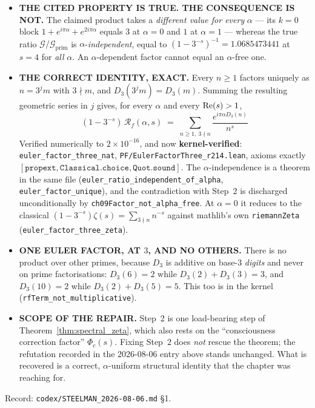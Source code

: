 \begin{itemize}
\item \textbf{THE CITED PROPERTY IS TRUE. THE CONSEQUENCE IS NOT.} The claimed
product takes a \emph{different value for every} $\alpha$ --- its $k=0$ block
$1+e^{i\pi\alpha}+e^{2i\pi\alpha}$ equals $3$ at $\alpha=0$ and $1$ at
$\alpha=1$ --- whereas the true ratio
$\mathcal{G}/\mathcal{G}_{\mathrm{prim}}$ is $\alpha$-\emph{independent}, equal
to $(1-3^{-s})^{-1} = 1.0685473441$ at $s=4$ for \emph{all} $\alpha$. An
$\alpha$-dependent factor cannot equal an $\alpha$-free one.
\item \textbf{THE CORRECT IDENTITY, EXACT.} Every $n\ge 1$ factors uniquely as
$n=3^{j}m$ with $3\nmid m$, and $D_3(3^{j}m)=D_3(m)$. Summing the resulting
geometric series in $j$ gives, for every $\alpha$ and every $\operatorname{Re}(s)>1$,
\[
  \boxed{\;(1-3^{-s})\,\mathcal{R}_f(\alpha,s)
    \;=\; \sum_{n\ge 1,\ 3\nmid n} \frac{e^{i\pi\alpha D_3(n)}}{n^{s}}\;}
\]
Verified numerically to $2\times10^{-16}$, and now \textbf{kernel-verified}:
\texttt{euler\_factor\_three\_nat}, \texttt{PF/EulerFactorThree\_r214.lean},
axioms exactly $[\texttt{propext},\texttt{Classical.choice},\texttt{Quot.sound}]$.
The $\alpha$-independence is a theorem in the same file
(\texttt{euler\_ratio\_independent\_of\_alpha},
\texttt{euler\_factor\_unique}), and the contradiction with Step~2 is
discharged unconditionally by \texttt{ch09Factor\_not\_alpha\_free}.
At $\alpha=0$ it reduces to the classical
$(1-3^{-s})\zeta(s)=\sum_{3\nmid n} n^{-s}$ against mathlib's own
\texttt{riemannZeta} (\texttt{euler\_factor\_three\_zeta}).
\item \textbf{ONE EULER FACTOR, AT $3$, AND NO OTHERS.} There is no product over
other primes, because $D_3$ is additive on base-3 \emph{digits} and never on
prime factorisations: $D_3(6)=2$ while $D_3(2)+D_3(3)=3$, and $D_3(10)=2$ while
$D_3(2)+D_3(5)=5$. This too is in the kernel
(\texttt{rfTerm\_not\_multiplicative}).
\item \textbf{SCOPE OF THE REPAIR.} Step~2 is one load-bearing step of
Theorem~\ref{thm:spectral_zeta}, which also rests on the ``consciousness
correction factor'' $\Phi_c(s)$. Fixing Step~2 does \emph{not} rescue the
theorem; the refutation recorded in the 2026-08-06 entry above stands
unchanged. What is recovered is a correct, $\alpha$-uniform structural identity
that the chapter was reaching for.
\end{itemize}

\noindent Record: \texttt{codex/STEELMAN\_2026-08-06.md} \S1.

